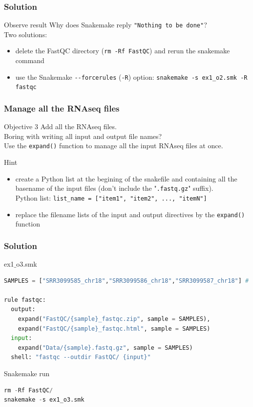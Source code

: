 \begin{frame}[containsverbatim]
\frametitle{Solution}
\begin{exampleblock}{Observe result}
Why does Snakemake reply \verb|"Nothing to be done"|?\\
Two solutions:\begin{itemize}
\item delete the FastQC directory (\verb|rm -Rf FastQC|) and rerun the snakemake command
\item use the Snakemake \verb|--forcerules| (\verb|-R|) option: \verb|snakemake -s ex1_o2.smk -R fastqc|
\end{itemize}
\end{exampleblock}
\end{frame}
\begin{frame}[containsverbatim]
\frametitle{Manage all the RNAseq files}
\begin{exampleblock}{Objective 3}
Add all the RNAseq files.\\
Boring with writing all input and output file names? \\
Use the \verb|expand()| function to manage all the input RNAseq files at once.
\end{exampleblock}
\begin{exampleblock}{Hint}
\begin{itemize}
    \item create a Python list at the begining of the snakefile and containing all the basename of the input files (don't include the "\verb|.fastq.gz|" suffix).\\
    Python list: \verb|list_name = ["item1", "item2", ..., "itemN"]|
    \item replace the filename lists of the input and output directives by the \verb|expand()| function
\end{itemize}
\end{exampleblock}
\end{frame}
\begin{frame}[containsverbatim]
\frametitle{Solution}
\begin{exampleblock}{ex1$\_$o3.smk}
\begin{lstlisting}[language=python]
SAMPLES = ["SRR3099585_chr18","SRR3099586_chr18","SRR3099587_chr18"] # add others samples

rule fastqc:
  output:
    expand("FastQC/{sample}_fastqc.zip", sample = SAMPLES),
    expand("FastQC/{sample}_fastqc.html", sample = SAMPLES)
  input:
    expand("Data/{sample}.fastq.gz", sample = SAMPLES)
  shell: "fastqc --outdir FastQC/ {input}"
\end{lstlisting}
\end{exampleblock}
\begin{exampleblock}{Snakemake run}
\begin{lstlisting}[language=python]
rm -Rf FastQC/
snakemake -s ex1_o3.smk
\end{lstlisting}
\end{exampleblock}
\end{frame}
